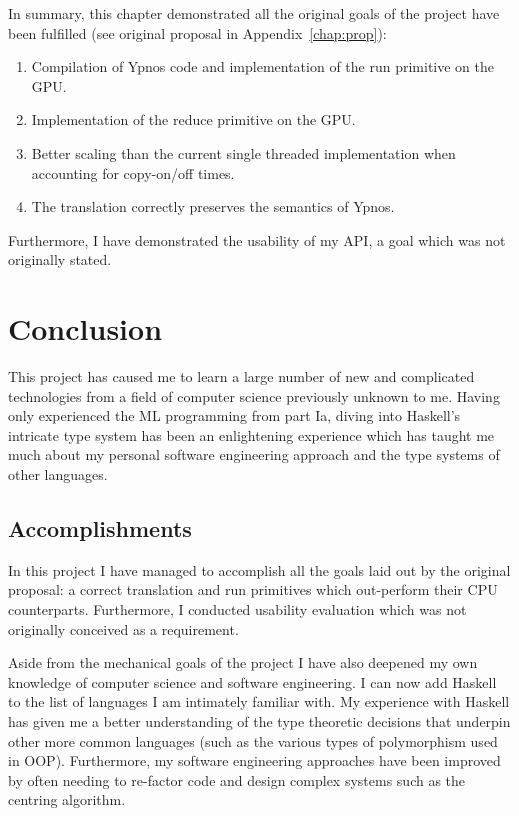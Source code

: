 \documentclass[12pt,a4paper,twoside]{scrbook}
\begin{document}
In summary, this chapter demonstrated all the original goals of the project have
been fulfilled (see original proposal in Appendix~\ref{chap:prop}):
\begin{enumerate}
\item Compilation of Ypnos code and implementation of the run primitive on the
  GPU.
\item Implementation of the reduce primitive on the GPU.
\item Better scaling than the current single threaded implementation when
  accounting for copy-on/off times.
\item The translation correctly preserves the semantics of Ypnos.
\end{enumerate}

Furthermore, I have demonstrated the usability of my API, a goal which was not
originally stated.

\chapter{Conclusion}

This project has caused me to learn a large number of new and complicated
technologies from a field of computer science previously unknown to me. Having
only experienced the ML programming from part Ia, diving into Haskell's
intricate type system has been an enlightening experience which has taught me
much about my personal software engineering approach and the type systems of
other languages.

\section{Accomplishments}

In this project I have managed to accomplish all the goals laid out by the
original proposal: a correct translation and run primitives which out-perform
their CPU counterparts. Furthermore, I conducted usability evaluation which was
not originally conceived as a requirement.

Aside from the mechanical goals of the project I have also deepened my own
knowledge of computer science and software engineering. I can now add Haskell to
the list of languages I am intimately familiar with. My experience with Haskell
has given me a better understanding of the type theoretic decisions that
underpin other more common languages (such as the various types of polymorphism
used in OOP). Furthermore, my software engineering approaches have been improved
by often needing to re-factor code and design complex systems such as the
centring algorithm.
\end{document}
